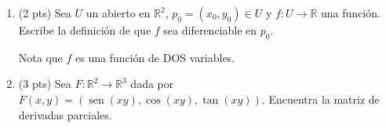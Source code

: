 \documentclass[12pt]{article}
\newcommand{\sen}{\operatorname{sen}}
\begin{document}
\bigskip

            
\bigskip
\bigskip
\bigskip


\begin{enumerate}

\item (2 pts) Sea $U$ un abierto en $\mathbb{R}^2$, $p_0=(x_0,y_0)\in U$
  y $f:U\to \mathbb{R}$ una
  funci\'on. Escribe la definici\'on de que $f$ sea diferenciable en $p_0$.

  Nota  que $f$ es una funci\'on de DOS variables.
  
  
\vspace{5cm}  
  
\item (3 pts) Sea $F:\mathbb{R}^2 \to \mathbb{R}^3$ dada por $F(x,y)=(\sen(xy), \cos(xy),\tan(xy))$.
  Encuentra la matriz de derivadas parciales.
  \end{enumerate}


  
\end{document}

